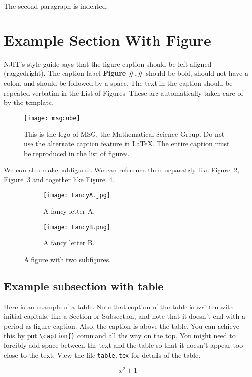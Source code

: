 The second paragraph is indented.

\section{Example Section With Figure}

NJIT's style guide says that the figure caption should be left aligned (raggedright). The caption label {\bf Figure \#.\#}  should be bold, should not have a colon, and should be followed by a space. The text in the caption should be repeated verbatim in the List of Figures. These are automatically taken care of by the template.

\begin{figure}[htbp]
\centering
\texttt{[image: msgcube]}
\caption{This is the logo of MSG, the Mathematical Science Group. Do not use the alternate caption feature in \LaTeX. The entire caption must be reproduced in the list of figures.}
\label{fig:1}
\end{figure}


We can also make subfigures. We can reference them separately like Figure~\ref{fig:first}, Figure~\ref{fig:second} and together like Figure~\ref{fig:doublefigure}.
\begin{figure}
\centering
\begin{subfigure}{0.4\textwidth}
    \texttt{[image: FancyA.jpg]}
    \caption{A fancy letter A.}
    \label{fig:first}
\end{subfigure}
\hfill
\begin{subfigure}{0.4\textwidth}
    \texttt{[image: FancyB.png]}
    \caption{A fancy letter B.}
    \label{fig:second}
\end{subfigure}
\caption{A figure with two subfigures.}
\label{fig:doublefigure}
\end{figure}

\newpage

\subsection{Example subsection with table}

Here is an example of a table. Note that caption of the table is written with initial capitals, like  a Section or Subsection, and note that it doesn't end with a period as figure caption. Also, the caption is above the table.  You can achieve this by put \verb#\caption{}# command all the way on the top.  You might need to forcibly add space between the text and the table so that it doesn't appear too close to the text.  View the file \texttt{table.tex} for details of the table.
\vspace{4mm}




\begin{equation}
x^2+1
\end{equation}

